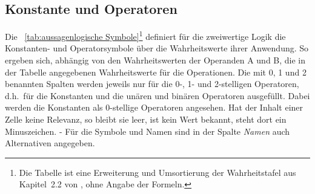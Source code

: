 \documentclass[english,ngerman,parskip=half,headsepline,footsepline]{scrreprt}
\makeatletter
\newcommand{\textdh}{d.\@ h.\@}
\makeatother
\begin{document}
	\subsection{Konstante und Operatoren}
	\label{sub:Operatoren}

	Die \tablename~\vref{tab:aussagenlogische Symbole}\footnote{ Die Tabelle ist eine Erweiterung und Umsortierung der Wahrheitstafel aus Kapitel~2.2 von \cite{bib:Junktor}, ohne Angabe der Formeln.} definiert für die zweiwertige Logik die Konstanten- und Operatorsymbole über die Wahrheitswerte ihrer Anwendung. So ergeben sich, abhängig von den Wahrheitswerten der Operanden A und B, die in der Tabelle angegebenen Wahrheitswerte für die Operationen. Die mit 0, 1 und 2 benannten Spalten werden jeweils nur für die 0-, 1- und 2-stelligen Operatoren, \textdh\ für die Konstanten und die unären und binären Operatoren ausgefüllt. Dabei werden die Konstanten als 0-stellige Operatoren angesehen. Hat der Inhalt einer Zelle keine Relevanz, so bleibt sie leer, ist kein Wert bekannt, steht dort ein Minuszeichen. - Für die Symbole und Namen sind in der Spalte \emph{Namen} auch Alternativen angegeben.
\end{document}

